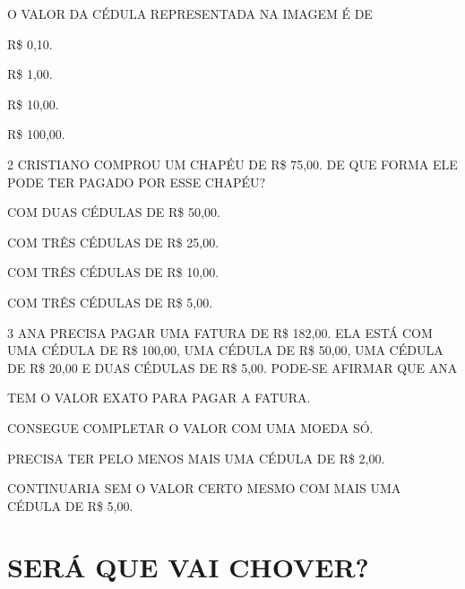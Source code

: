 O VALOR DA CÉDULA REPRESENTADA NA IMAGEM É DE


\begin{escolha}
\item R\$ 0,10.

\item R\$ 1,00.

\item R\$ 10,00.

\item R\$ 100,00.
\end{escolha}

\pagebreak
\num{2} CRISTIANO COMPROU UM CHAPÉU DE R\$ 75,00. DE QUE FORMA ELE PODE TER PAGADO POR ESSE CHAPÉU?

\begin{escolha}
\item COM DUAS CÉDULAS DE R\$ 50,00.

\item COM TRÊS CÉDULAS DE R\$ 25,00.

\item COM TRÊS CÉDULAS DE R\$ 10,00.

\item COM TRÊS CÉDULAS DE R\$ 5,00.
\end{escolha}


\num{3} ANA PRECISA PAGAR UMA FATURA DE R\$ 182,00. ELA ESTÁ COM UMA CÉDULA DE R\$ 100,00, UMA CÉDULA DE R\$ 50,00, UMA CÉDULA DE R\$ 20,00 E DUAS CÉDULAS DE R\$ 5,00. PODE-SE AFIRMAR QUE ANA

\begin{escolha}
\item TEM O VALOR EXATO PARA PAGAR A FATURA.

\item CONSEGUE COMPLETAR O VALOR COM UMA MOEDA SÓ.

\item PRECISA TER PELO MENOS MAIS UMA CÉDULA DE R\$ 2,00.

\item CONTINUARIA SEM O VALOR CERTO MESMO COM MAIS UMA CÉDULA DE R\$ 5,00.
\end{escolha}

\chapter{SERÁ QUE VAI CHOVER?}


